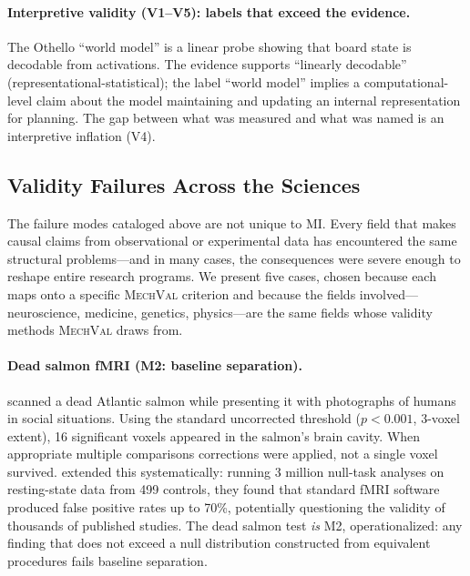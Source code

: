 \documentclass{article}
\newcommand{\mechval}{\textsc{MechVal}}
\begin{document}
\paragraph{Interpretive validity (V1--V5): labels that exceed the evidence.}
The Othello ``world model'' \citep{li2023othello} is a linear probe showing that board state is decodable from activations. The evidence supports ``linearly decodable'' (representational-statistical); the label ``world model'' implies a computational-level claim about the model maintaining and updating an internal representation for planning. The gap between what was measured and what was named is an interpretive inflation (V4).

\subsection{Validity Failures Across the Sciences}

The failure modes cataloged above are not unique to MI. Every field that makes causal claims from observational or experimental data has encountered the same structural problems---and in many cases, the consequences were severe enough to reshape entire research programs. We present five cases, chosen because each maps onto a specific \mechval{} criterion and because the fields involved---neuroscience, medicine, genetics, physics---are the same fields whose validity methods \mechval{} draws from.

\paragraph{Dead salmon fMRI (M2: baseline separation).}
\citet{bennett2010neural} scanned a dead Atlantic salmon while presenting it with photographs of humans in social situations. Using the standard uncorrected threshold ($p < 0.001$, 3-voxel extent), 16 significant voxels appeared in the salmon's brain cavity. When appropriate multiple comparisons corrections were applied, not a single voxel survived. \citet{eklund2016cluster} extended this systematically: running 3 million null-task analyses on resting-state data from 499 controls, they found that standard fMRI software produced false positive rates up to 70\%, potentially questioning the validity of thousands of published studies. The dead salmon test \emph{is} M2, operationalized: any finding that does not exceed a null distribution constructed from equivalent procedures fails baseline separation.
\end{document}
